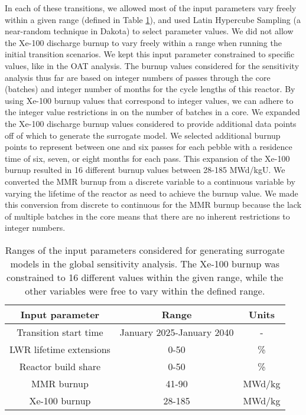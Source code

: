 In each of these
transitions, we allowed most of the input parameters vary freely 
within a given range (defined in Table \ref{tab:global_ranges}), 
and used Latin Hypercube Sampling (a near-random technique in 
Dakota) to select parameter values. We did not allow 
the Xe-100 discharge burnup to vary freely within a range 
when running the initial transition scenarios. We kept this input
parameter constrained to 
specific values, like in the \gls{OAT} analysis. The burnup values 
considered for the sensitivity 
analysis thus far are based on integer numbers of passes through 
the core (batches) and integer number of 
months for the cycle lengths of this reactor. By using 
Xe-100 burnup values that correspond to integer values, we can 
adhere to the integer value restrictions in \Cyclus on the number of 
batches in a core.
We expanded the Xe-100 discharge burnup values considered 
to provide additional data points off of which to 
generate the surrogate model. We selected additional burnup points 
to represent 
between one and six passes for each pebble with a residence time of six, seven, 
or eight months for each pass. This expansion of the Xe-100 burnup resulted 
in 16 different burnup values between 28-185 MWd/kgU.
We converted the \gls{MMR} burnup 
from a discrete variable to a continuous variable by varying 
the lifetime of the reactor as need to achieve the burnup value. We made 
this conversion from discrete to continuous for the \gls{MMR} burnup 
because the lack of multiple batches in the core means that there are 
no inherent restrictions to integer numbers. 

\begin{table}[h!]
    \centering 
    \caption{Ranges of the input parameters considered for generating 
    surrogate models in the global sensitivity analysis. The Xe-100 
    burnup was constrained to 16 different values within the given range, 
    while the other variables were free to vary within the defined range.}
    \label{tab:global_ranges}
    \begin{tabular}{c c c}
        \hline
        Input parameter & Range & Units \\
        \hline 
        Transition start time & January 2025-January 2040 & - \\
        LWR lifetime extensions & 0-50 & \% \\
        Reactor build share & 0-50 & \% \\
        \gls{MMR} burnup & 41-90 & MWd/kg \\
        Xe-100 burnup & 28-185 & MWd/kg \\
        \hline
    \end{tabular}
\end{table}

